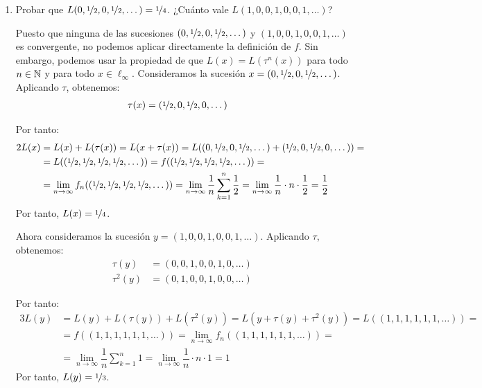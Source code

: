 \begin{ejercicio}
\begin{enumerate}
\begin{itemize}
        Por tanto, $L(x) = L(\tau^{n + 1}(x))$.
    \end{itemize}

    Por el principio de inducción, se tiene que $L(x) = L(\tau^n(x))$ para todo $n \in \bb{N}$ y para todo $x \in \ell_\infty$.
    \item Probar que $L(0, \nicefrac{1}{2}, 0, \nicefrac{1}{2}, \dots) = \nicefrac{1}{4}$. ¿Cuánto vale $L(1, 0, 0, 1, 0, 0, 1, \dots)$?
    
    Puesto que ninguna de las sucesiones $(0, \nicefrac{1}{2}, 0, \nicefrac{1}{2}, \dots)$ y $(1, 0, 0, 1, 0, 0, 1, \dots)$ es convergente, no podemos aplicar directamente la definición de $f$. Sin embargo, podemos usar la propiedad de que $L(x) = L(\tau^n(x))$ para todo $n \in \bb{N}$ y para todo $x \in \ell_\infty$. Consideramos la sucesión $x = (0, \nicefrac{1}{2}, 0, \nicefrac{1}{2}, \dots)$. Aplicando $\tau$, obtenemos:
    \begin{align*}
        \tau(x) &= (\nicefrac{1}{2}, 0, \nicefrac{1}{2}, 0, \dots)
    \end{align*}

    Por tanto:
    \begin{align*}
        2L(x) &= L(x) + L(\tau(x)) = L(x + \tau(x)) = L((0, \nicefrac{1}{2}, 0, \nicefrac{1}{2}, \dots) + (\nicefrac{1}{2}, 0, \nicefrac{1}{2}, 0, \dots)) =\\&= L((\nicefrac{1}{2}, \nicefrac{1}{2}, \nicefrac{1}{2}, \nicefrac{1}{2}, \dots)) = f((\nicefrac{1}{2}, \nicefrac{1}{2}, \nicefrac{1}{2}, \nicefrac{1}{2}, \dots)) =\\&= \lim_{n \to \infty} f_n((\nicefrac{1}{2}, \nicefrac{1}{2}, \nicefrac{1}{2}, \nicefrac{1}{2}, \dots))
        = \lim_{n \to \infty} \dfrac{1}{n} \sum_{k = 1}^n \frac{1}{2} = \lim_{n \to \infty} \dfrac{1}{n} \cdot n \cdot \frac{1}{2} = \frac{1}{2}
    \end{align*}
    Por tanto, $L(x) = \nicefrac{1}{4}$.
    
    Ahora consideramos la sucesión $y = (1, 0, 0, 1, 0, 0, 1, \dots)$. Aplicando $\tau$, obtenemos:
    \begin{align*}
        \tau(y) &= (0, 0, 1, 0, 0, 1, 0, \dots)\\
        \tau^2(y) &= (0, 1, 0, 0, 1, 0, 0, \dots)
    \end{align*}

    Por tanto:
    \begin{align*}
        3L(y) &= L(y) + L(\tau(y)) + L(\tau^2(y)) = L(y + \tau(y) + \tau^2(y)) = L((1, 1, 1, 1, 1, 1, \dots)) =\\&= f((1, 1, 1, 1, 1, 1, \dots)) = \lim_{n \to \infty} f_n((1, 1, 1, 1, 1, 1, \dots)) =\\&= \lim_{n \to \infty} \dfrac{1}{n} \sum_{k = 1}^n 1 = \lim_{n \to \infty} \dfrac{1}{n} \cdot n \cdot 1 = 1
    \end{align*}
    Por tanto, $L(y) = \nicefrac{1}{3}$.
\end{enumerate}
\end{ejercicio}

